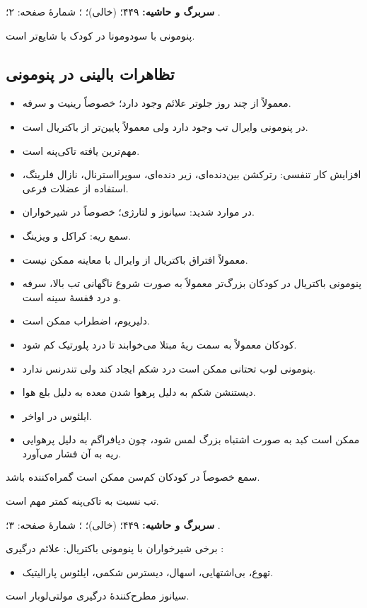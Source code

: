 \documentclass[12pt,a4paper]{article}
\begin{document}
\textbf{سربرگ و حاشیه:} ۴۴۹؛  (خالی)؛ ؛ شمارهٔ صفحه: ۲؛ .

پنومونی با سودومونا در کودک با  شایع‌تر است.
\subsection*{تظاهرات بالینی در پنومونی}
\begin{itemize}
\item معمولاً از چند روز جلوتر علائم  وجود دارد؛ خصوصاً رینیت و سرفه.
\item در پنومونی وایرال تب وجود دارد ولی معمولاً پایین‌تر از باکتریال است.
\item مهم‌ترین یافته تاکی‌پنه است.
\item افزایش کار تنفسی: رترکشن بین‌دنده‌ای، زیر دنده‌ای، سوپرااسترنال، نازال فلرینگ، استفاده از عضلات فرعی.
\item در موارد شدید: سیانوز و لتارژی؛ خصوصاً در شیرخواران.
\item سمع ریه: کراکل و ویزینگ.
\item معمولاً افتراق باکتریال از وایرال با معاینه ممکن نیست.
\item پنومونی باکتریال در کودکان بزرگ‌تر معمولاً به صورت شروع ناگهانی تب بالا، سرفه و درد قفسهٔ سینه است.
\item دلیریوم، اضطراب ممکن است.
\item کودکان معمولاً به سمت ریهٔ مبتلا می‌خوابند تا درد پلورتیک کم شود.
\item پنومونی لوب تحتانی ممکن است درد شکم ایجاد کند ولی تندرنس ندارد.
\item دیستنشن شکم به دلیل پرهوا شدن معده به دلیل بلع هوا.
\item ایلئوس در اواخر.
\item ممکن است کبد به صورت اشتباه بزرگ لمس شود، چون دیافراگم به دلیل پرهوایی ریه به آن فشار می‌آورد.
\end{itemize}
سمع خصوصاً در کودکان کم‌سن ممکن است گمراه‌کننده باشد.

تب نسبت به تاکی‌پنه کمتر مهم است.

\textbf{سربرگ و حاشیه:} ۴۴۹؛  (خالی)؛ ؛ شمارهٔ صفحه: ۳؛ .

برخی شیرخواران با پنومونی باکتریال: علائم درگیری :
\begin{itemize}
\item تهوع، بی‌اشتهایی، اسهال، دیسترس شکمی، ایلئوس پارالیتیک.
\end{itemize}
سیانوز مطرح‌کنندهٔ درگیری مولتی‌لوبار است.
\end{document}
